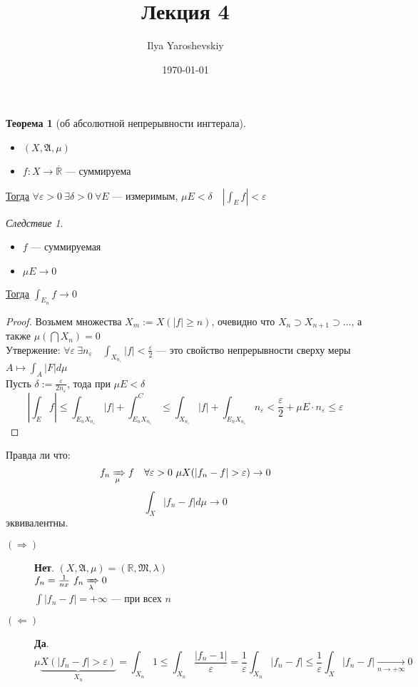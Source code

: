 \documentclass[english]{article}
\author{Ilya Yaroshevskiy}
\date{\today}
\title{Лекция 4}
\newcommand{\R}{\mathbb{R}}
\theoremstyle{plain}
\theoremstyle{remark}
\newtheorem{corollary}{Следствие}[theorem]
\theoremstyle{definition}
\newtheorem{theorem}{Теорема}[section]
\begin{document}
\maketitle
\tableofcontents

\newcommand{\X}{\mathcal{X}}
\newcommand{\A}{\mathfrak{A}}
\newcommand{\B}{\mathfrak{B}}

\begin{theorem}[об абсолютной непрерывности ингтерала]
\-
\begin{itemize}
\item \((X, \A, \mu)\)
\item \(f: X \to \overline{\R}\) --- суммируема
\end{itemize}
\uline{Тогда} \(\forall \varepsilon > 0\ \exists \delta > 0\ \forall E\) --- измеримым, \(\mu E < \delta\quad |\int_E f| < \varepsilon\)
\end{theorem}
\begin{corollary}
\-
\begin{itemize}
\item \(f\) --- суммируемая
\item \(\mu E \to 0\)
\end{itemize}
\uline{Тогда} \(\int_{E_n} f \to 0\)
\end{corollary}
\begin{proof}
Возьмем множества \(X_m := X(|f| \ge n)\), очевидно что \(X_n \supset X_{n + 1} \supset \dots\), а также \(\mu(\bigcap X_n) = 0\) \\
Утвержение: \(\forall \varepsilon\ \exists n_\varepsilon\quad \int_{X_{n_\varepsilon}}|f| < \frac{\varepsilon}{2}\) ---
это свойство непрерывности сверху меры \(A \mapsto \int_A |F| d\mu\) \\
Пусть \(\delta:=\frac{\varepsilon}{2n_\varepsilon}\), тода при \(\mu E < \delta\)
\[ \left|\int_E f\right| \le\int_{E_nX_{n_\varepsilon}}|f| + \int_{E_nX_{n_\varepsilon}}^C \le \int_{X_{n_\varepsilon}} |f| + \int_{E_nX_{n_\varepsilon}} n_\varepsilon < \frac{\varepsilon}{2} + \mu E\cdot n_\varepsilon \le \varepsilon \]
\end{proof}
Правда ли что:
\[ f_n \xRightarrow[\mu]{} f\quad \forall \varepsilon > 0\ \mu X(|f_n - f| > \varepsilon) \to 0\]
\[ \int_X|f_n - f| d\mu \to 0 \]
эквивалентны.
\begin{description}
\item[{\((\Rightarrow)\)}] \textbf{Нет}. \((X, \A, \mu) = (\R, \mathfrak{M}, \lambda)\) \\
\(f_n = \frac{1}{nx}\ f_n \xRightarrow[\lambda]{} 0\) \\
\(\int|f_n - f| = + \infty\) --- при всех \(n\)
\item[{\((\Leftarrow)\)}] \textbf{Да}. \[\mu \underbrace{X(|f_n - f| > \varepsilon)}_{X_n} = \int_{X_n} 1 \le \int_{X_n} \frac{|f_n - 1|}{\varepsilon} = \frac{1}{\varepsilon}\int_{X_n}|f_n - f| \le \frac{1}{\varepsilon}\int_X|f_n - f| \xrightarrow[n\to +\infty]{} 0\]
\end{description}
\end{document}
